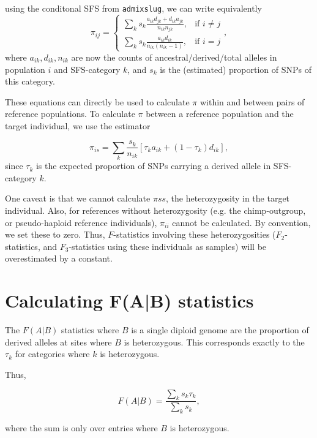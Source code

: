\documentclass[10pt,a4paper]{article}
\begin{document}
using the conditonal SFS from \texttt{admixslug}, we can write equivalently
\begin{equation}
\pi_{ij} = \begin{cases}
\sum_k s_k \frac{a_{ik}d_{jk} + d_{ik}a_{jk}} {n_{ik}n_{jk}} ,& \text{if } i \neq j\\
\sum_k s_k \frac{a_{ik}d_{ik}}{n_{ik}(n_{ik} -1)},              & \text{if }i =j
\end{cases},
\end{equation}
where $a_{ik}, d_{ik}, n_{ik}$ are now the counts of ancestral/derived/total alleles in population $i$ and SFS-category $k$, and $s_k$ is the (estimated) proportion of SNPs of this category.

These equations can directly be used to calculate $\pi$ within and between pairs of reference populations. To calculate $\pi$ between a reference population and the target individual, we use the estimator

\begin{equation}
\pi_{is} = \sum_k \frac{s_k}{n_{ik}} \left[\tau_k a_{ik}+ (1-\tau_k) d_{ik}\right],
\end{equation}
since $\tau_k$ is the expected proportion of SNPs carrying a derived allele in SFS-category $k$.


One caveat is that we cannot calculate $\pi{ss}$, the heterozygosity in the target individual. Also, for references without heterozygosity (e.g. the chimp-outgroup, or pseudo-haploid reference individuals), $\pi_{ii}$ cannot be calculated. By convention, we set these to zero. Thus, $F$-statistics involving these heterozygosities ($F_2$-statistics, and $F_3$-statistics using these individuals as samples) will be overestimated by a constant.


\section{Calculating F(A|B) statistics}
The $F(A|B)$ statistics where $B$ is a single diploid genome are the proportion of derived alleles at sites where $B$ is heterozygous. This corresponds exactly to the $\tau_k$ for categories where $k$ is heterozygous.

Thus,

\begin{equation}
	F(A|B) = \frac{\sum_k s_k \tau_k}{\sum_k s_k},
\end{equation}

where the sum is only over entries where $B$ is heterozygous.



\end{document}

